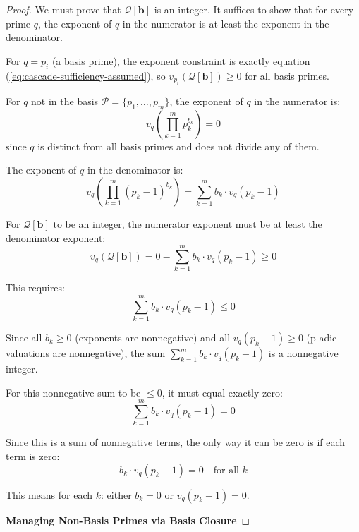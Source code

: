 \begin{proof}
We must prove that $\mathcal{Q}[\mathbf{b}]$ is an integer. It suffices to show that for every prime $q$, the exponent of $q$ in the numerator is at least the exponent in the denominator.

For $q = p_i$ (a basis prime), the exponent constraint is exactly equation (\ref{eq:cascade-sufficiency-assumed}), so $v_{p_i}(\mathcal{Q}[\mathbf{b}]) \geq 0$ for all basis primes.

For $q$ not in the basis $\mathcal{P} = \{p_1, \ldots, p_m\}$, the exponent of $q$ in the numerator is:
\begin{equation}
v_q\left(\prod_{k=1}^m p_k^{b_k}\right) = 0
\end{equation}
since $q$ is distinct from all basis primes and does not divide any of them.

The exponent of $q$ in the denominator is:
\begin{equation}
v_q\left(\prod_{k=1}^m (p_k - 1)^{b_k}\right) = \sum_{k=1}^m b_k \cdot v_q(p_k - 1)
\end{equation}

For $\mathcal{Q}[\mathbf{b}]$ to be an integer, the numerator exponent must be at least the denominator exponent:
\begin{equation}
v_q(\mathcal{Q}[\mathbf{b}]) = 0 - \sum_{k=1}^m b_k \cdot v_q(p_k - 1) \geq 0
\end{equation}

This requires:
\begin{equation}
\sum_{k=1}^m b_k \cdot v_q(p_k - 1) \leq 0
\end{equation}

Since all $b_k \geq 0$ (exponents are nonnegative) and all $v_q(p_k - 1) \geq 0$ (p-adic valuations are nonnegative), the sum $\sum_{k=1}^m b_k \cdot v_q(p_k - 1)$ is a nonnegative integer.

For this nonnegative sum to be $\leq 0$, it must equal exactly zero:
\begin{equation}
\sum_{k=1}^m b_k \cdot v_q(p_k - 1) = 0
\end{equation}

Since this is a sum of nonnegative terms, the only way it can be zero is if each term is zero:
\begin{equation}
b_k \cdot v_q(p_k - 1) = 0 \quad \text{for all } k
\end{equation}

This means for each $k$: either $b_k = 0$ or $v_q(p_k - 1) = 0$.

\noindent \textbf{Managing Non-Basis Primes via Basis Closure}


\end{proof}
